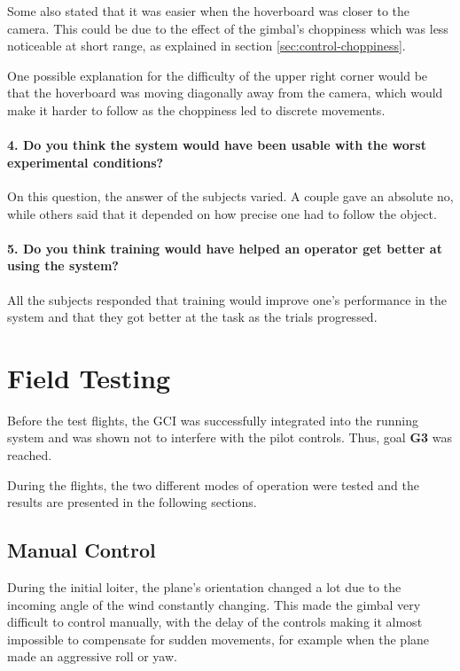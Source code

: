 \documentclass[nofilelist]{cslthse-msc}
\begin{document}
Some also stated that it was easier when the hoverboard was closer to the camera. This could be due to the effect of the gimbal's choppiness which was less noticeable at short range, as explained in section \ref{sec:control-choppiness}.

One possible explanation for the difficulty of the upper right corner would be that the hoverboard was moving diagonally away from the camera, which would make it harder to follow as the choppiness led to discrete movements.

\paragraph{4. Do you think the system would have been usable with the worst experimental conditions?}
On this question, the answer of the subjects varied. A couple gave an absolute no, while others said that it depended on how precise one had to follow the object. 

\paragraph{5. Do you think training would have helped an operator get better at using the system?}
All the subjects responded that training would improve one's performance in the system and that they got better at the task as the trials progressed. 



\section{Field Testing}
Before the test flights, the GCI was successfully integrated into the running system and was shown not to interfere with the pilot controls. Thus, goal \textbf{G3} was reached.

During the flights, the two different modes of operation were tested and the results are presented in the following sections.

\subsection{Manual Control}
During the initial loiter, the plane's orientation changed a lot due to the incoming angle of the wind constantly changing. This made the gimbal very difficult to control manually, with the delay of the controls making it almost impossible to compensate for sudden movements, for example when the plane made an aggressive roll or yaw.
\end{document}

